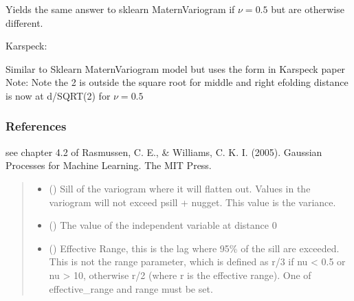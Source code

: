 \documentclass[letterpaper,10pt,english]{sphinxmanual}
\begin{document}
\begin{fulllineitems}
\sphinxAtStartPar
Yields the same answer to sklearn MaternVariogram if \(\nu=0.5\)
but are otherwise different.

\sphinxAtStartPar
Karspeck:

\sphinxAtStartPar
Similar to Sklearn MaternVariogram model but uses the form in Karspeck paper
Note: Note the 2 is outside the square root for middle and right
e\sphinxhyphen{}folding distance is now at d/SQRT(2) for \(\nu=0.5\)
\subsubsection*{References}

\sphinxAtStartPar
see chapter 4.2 of Rasmussen, C. E., \& Williams, C. K. I. (2005).
Gaussian Processes for Machine Learning. The MIT Press.
\begin{quote}\begin{description}
\begin{itemize}
\item {}
\sphinxAtStartPar
{} (\sphinxstyleliteralemphasis{\sphinxupquote{ | }}) \textendash{} Sill of the variogram where it will flatten out. Values in the variogram
will not exceed psill + nugget. This value is the variance.

\item {}
\sphinxAtStartPar
{} (\sphinxstyleliteralemphasis{\sphinxupquote{ | }}) \textendash{} The value of the independent variable at distance 0

\item {}
\sphinxAtStartPar
{} (\sphinxstyleliteralemphasis{\sphinxupquote{ | }}\sphinxstyleliteralemphasis{\sphinxupquote{ | }}) \textendash{} Effective Range, this is the lag where 95\% of the sill are exceeded.
This is not the range parameter, which is defined as r/3 if nu \textless{} 0.5 or
nu \textgreater{} 10, otherwise r/2 (where r is the effective range). One of
effective\_range and range must be set.


\end{itemize}
\end{description}
\end{quote}
\end{fulllineitems}
\end{document}
